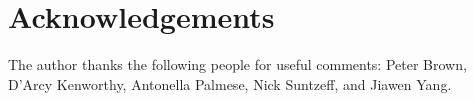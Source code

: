 \section*{Acknowledgements}
The author thanks the following people for useful comments: Peter Brown, D'Arcy Kenworthy, Antonella Palmese, Nick Suntzeff, and Jiawen Yang.
{}
% 
